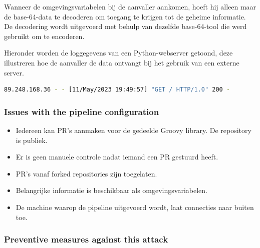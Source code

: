 Wanneer de omgevingsvariabelen bij de aanvaller aankomen, hoeft hij alleen maar de base-64-data te decoderen om toegang te krijgen tot de geheime informatie. De decodering wordt uitgevoerd met behulp van dezelfde base-64-tool die werd gebruikt om te encoderen. 
\newline

Hieronder worden de loggegevens van een Python-webserver getoond, deze illustreren hoe de aanvaller de data ontvangt bij het gebruik van een externe server.
\newline

\begin{lstlisting}[language=bash, style=bashstyle]
89.248.168.36 - - [11/May/2023 19:49:57] "GET / HTTP/1.0" 200 -
\end{lstlisting}

\subsubsection{
{Issues with the pipeline configuration}}
\label{sec:Problemen met de pipeline configuratie}

\begin{itemize}
  \item Iedereen kan PR's aanmaken voor de gedeelde Groovy library. De repository is publiek.
  \item Er is geen manuele controle nadat iemand een PR gestuurd heeft.
  \item PR's vanaf forked repositories zijn toegelaten.
  \item Belangrijke informatie is beschikbaar als omgevingsvariabelen.
  \item De machine waarop de pipeline uitgevoerd wordt, laat connecties naar buiten toe.
\end{itemize}

\subsubsection{
{Preventive measures against this attack}}
\label{sec:Hoe deze aanval te voorkomen}


